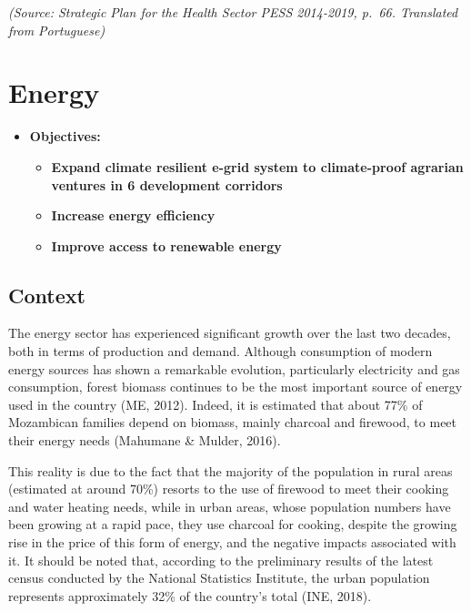 \documentclass[
]{book}
\providecommand{\tightlist}{%
  \setlength{\itemsep}{0pt}\setlength{\parskip}{0pt}}
\begin{document}
\emph{(Source: Strategic Plan for the Health Sector PESS 2014-2019, p.~66. Translated from Portuguese)}

\hypertarget{energy}{%
\section{Energy}\label{energy}}

\begin{itemize}
\tightlist
\item
  \textbf{Objectives:}

  \begin{itemize}
  \tightlist
  \item
    \textbf{Expand climate resilient e-grid system to climate-proof agrarian ventures in 6 development corridors}
  \item
    \textbf{Increase energy efficiency}
  \item
    \textbf{Improve access to renewable energy}
  \end{itemize}
\end{itemize}

\hypertarget{context-5}{%
\subsection{Context}\label{context-5}}

The energy sector has experienced significant growth over the last two decades, both in terms of production and demand. Although consumption of modern energy sources has shown a remarkable evolution, particularly electricity and gas consumption, forest biomass continues to be the most important source of energy used in the country (ME, 2012). Indeed, it is estimated that about 77\% of Mozambican families depend on biomass, mainly charcoal and firewood, to meet their energy needs (Mahumane \& Mulder, 2016).

This reality is due to the fact that the majority of the population in rural areas (estimated at around 70\%) resorts to the use of firewood to meet their cooking and water heating needs, while in urban areas, whose population numbers have been growing at a rapid pace, they use charcoal for cooking, despite the growing rise in the price of this form of energy, and the negative impacts associated with it. It should be noted that, according to the preliminary results of the latest census conducted by the National Statistics Institute, the urban population represents approximately 32\% of the country's total (INE, 2018).
\end{document}

